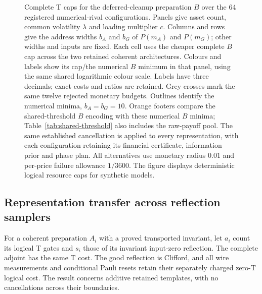 \documentclass[11pt]{article}
\begin{document}
\begin{figure}[!htb]
\caption{Complete T caps for the deferred-cleanup preparation $B$ over the 64 registered numerical-rival configurations. Panels give asset count, common volatility $\lambda$ and loading multiplier $c$. Columns and rows give the address widths $b_A$ and $b_G$ of $P(m_A)$ and $P(m_G)$; other widths and inputs are fixed. Each cell uses the cheaper complete $B$ cap across the two retained coherent architectures. Colours and labels show its cap/the numerical $B$ minimum in that panel, using the same shared logarithmic colour scale. Labels have three decimals; exact costs and ratios are retained. Grey crosses mark the same twelve rejected monetary budgets. Outlines identify the numerical minima, $b_A=b_G=10$. Orange footers compare the shared-threshold $B$ encoding with these numerical $B$ minima; Table~\ref{tab:shared-threshold} also includes the raw-payoff pool. The same established cancellation is applied to every representation, with each configuration retaining its financial certificate, information prior and phase plan. All alternatives use monetary radius $0.01$ and per-price failure allowance $1/3600$. The figure displays deterministic logical resource caps for synthetic models.}
\label{fig:pricing-precision}
\end{figure}


\subsection{Representation transfer across reflection samplers}

For a coherent preparation $A_i$ with a proved transported invariant,
let $a_i$ count its logical T gates
and $s_i$ those of its invariant input-zero reflection. The complete
adjoint has the same T cost. The good reflection is Clifford, and all
wire measurements and conditional Pauli resets retain their separately
charged zero-T logical cost. The result concerns additive retained
templates, with no cancellations across their boundaries.
\end{document}
